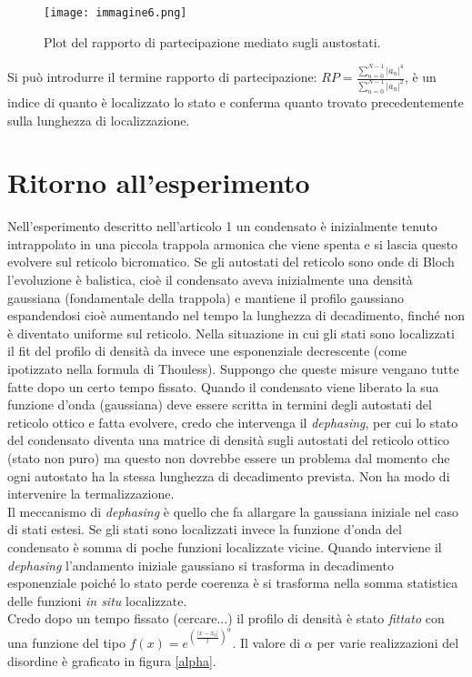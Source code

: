 \documentclass[10pt,a4paper]{article}
\begin{document}
\begin{figure}[!htb]
\centering
\texttt{[image: immagine6.png]}
\caption{Plot del rapporto di partecipazione mediato sugli austostati.\label{partecipazione}}
\end{figure}

Si può introdurre il termine rapporto di partecipazione: $RP = \frac{\sum_{n=0}^{N-1} |a_n|^4}{\sum_{n=0}^{N-1} |a_n|^2}$, è un indice di quanto è localizzato lo stato e conferma quanto trovato precedentemente sulla lunghezza di localizzazione.

\section{Ritorno all'esperimento}
Nell'esperimento descritto nell'articolo 1 un condensato è inizialmente tenuto intrappolato in una piccola trappola armonica che viene spenta e si lascia questo evolvere sul reticolo bicromatico. 
Se gli autostati del reticolo sono onde di Bloch l'evoluzione è balistica, cioè il condensato aveva inizialmente una densità gaussiana (fondamentale della trappola) e mantiene il profilo gaussiano espandendosi cioè aumentando nel tempo la lunghezza di decadimento, finché non è diventato uniforme sul reticolo. Nella situazione in cui gli stati sono localizzati il fit del profilo di densità da invece une esponenziale decrescente (come ipotizzato nella formula di Thouless). Suppongo che queste misure vengano tutte fatte dopo un certo tempo fissato. 
Quando il condensato viene liberato la sua funzione d'onda (gaussiana) deve essere scritta in termini degli autostati del reticolo ottico e fatta evolvere, credo che intervenga il \emph{dephasing}, per cui lo stato del condensato diventa una matrice di densità sugli autostati del reticolo ottico (stato non puro) ma questo non dovrebbe essere un problema dal momento che ogni autostato ha la stessa lunghezza di decadimento prevista. Non ha modo di intervenire la termalizzazione.\\
Il meccanismo di \emph{dephasing} è quello che fa allargare la gaussiana iniziale nel caso di stati estesi. Se gli stati sono localizzati invece la funzione d'onda del condensato è somma di poche funzioni localizzate vicine. Quando interviene il \emph{dephasing} l'andamento iniziale gaussiano si trasforma in decadimento esponenziale poiché lo stato perde coerenza è si trasforma nella somma statistica delle funzioni \emph{in situ} localizzate.\\
Credo dopo un tempo fissato (cercare...) il profilo di densità è stato \emph{fittato} con una funzione del tipo $f(x) = e^{(\frac{|x-x_0|}{l})^{\alpha}}$. Il valore di $\alpha$ per varie realizzazioni del disordine è graficato in figura \ref{alpha}.
\end{document}
